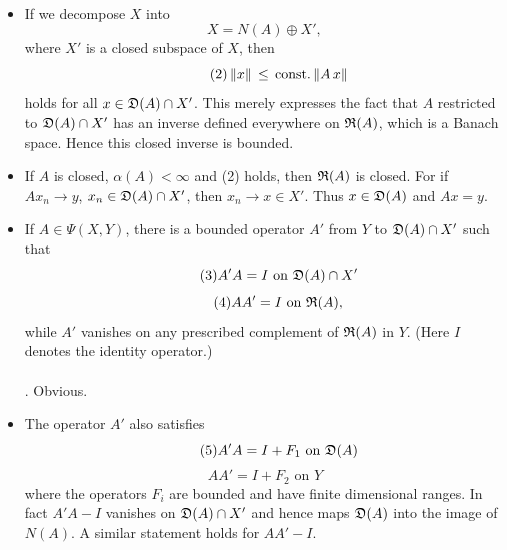 \documentclass[11pt,twoside]{article}
\begin{document}
\paragraph*{}
\begin{itemize}[leftmargin=12mm]
\item[(O-1)]
If we decompose $X$ into
\begin{equation}\tag{1}
X = N(A) \oplus X',
\end{equation}
where $X'$ is a closed subspace of $X$, then
\begin{equation}\tag{2}
\left\lVert x \right\rVert \, \leq \, \mbox{const.} \left\lVert A \,x \right\rVert
\end{equation}
holds for all $x \in \mathfrak{D}(A) \cap X'$. 
This merely expresses the fact
that $A$ restricted to $\mathfrak{D}(A) \cap X'$
has an inverse defined everywhere on $\mathfrak{R}(A)$,
which is a Banach space.
Hence this closed inverse is bounded.

\item[(O-2)]
If $A$ is closed, $\alpha(A) < \infty$ and (2) holds,
then $\mathfrak{R}(A)$ is closed.
For if $A x_n \to y$,
$x_n \in \mathfrak{D}(A) \cap X'$,
then $x_n \to x \in X'$.
Thus $x \in \mathfrak{D}(A)$ and $Ax = y$.

\item[(O-3)]
If $A \in \Psi(X,Y)$,
there is a bounded operator $A'$ from $Y$ to $\mathfrak{D}(A) \cap X'$ such that
\begin{equation}\tag{3}
A'A = I \mbox{ on } \mathfrak{D}(A) \cap X'
\end{equation}
\begin{equation}\tag{4}
AA' = I \mbox{ on } \mathfrak{R}(A),
\end{equation}
while $A'$ vanishes on any prescribed complement of $\mathfrak{R}(A)$ in $Y$.
(Here $I$ denotes the identity operator.)

\paragraph*{}
\Proof.
Obvious.

\item[(O-4)]
The operator $A'$ also satisfies
\begin{equation}\tag{5}
A'A = I +F_1 \mbox{ on } \mathfrak{D}(A)
\end{equation}
\begin{equation}\tag{6}
AA ' = I + F_2 \mbox{ on } Y
\end{equation}
where the operators $F_i$ are bounded and have finite dimensional
ranges.
In fact $A'A -I$ vanishes on $\mathfrak{D}(A) \cap X'$
and hence maps $\mathfrak{D}(A)$ into the image of $N(A)$.
A similar statement holds for $AA' -I$.


\end{itemize}
\end{document}
